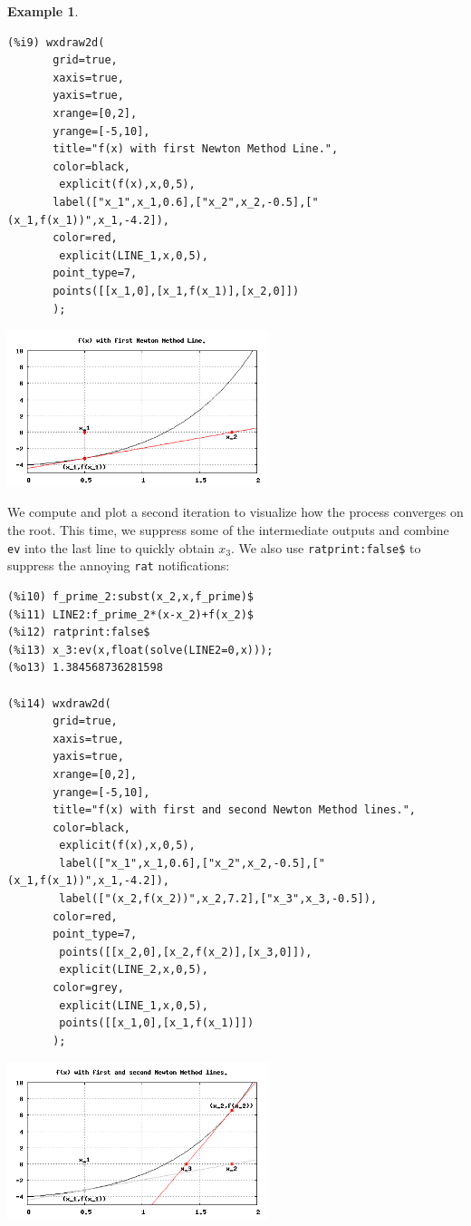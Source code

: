 \documentclass[10.5pt,twoside]{report}
\theoremstyle{definition}
\newtheorem{exmp}{Example}[section]
\begin{document}
\begin{exmp}
\begin{verbatim}
(%i9) wxdraw2d(
       grid=true,
       xaxis=true,
       yaxis=true,
       xrange=[0,2],
       yrange=[-5,10],
       title="f(x) with first Newton Method Line.",
       color=black,
        explicit(f(x),x,0,5),
       label(["x_1",x_1,0.6],["x_2",x_2,-0.5],["(x_1,f(x_1))",x_1,-4.2]),
       color=red,
        explicit(LINE_1,x,0,5),
       point_type=7,
       points([[x_1,0],[x_1,f(x_1)],[x_2,0]])
       );
\end{verbatim}


\includegraphics[width=3in]{example_5_4_1_2}


We compute and plot a second iteration to visualize how the process converges on the root. This time, we suppress some of the intermediate outputs and combine \verb|ev| into the last line to quickly obtain $x_3$.  We also use \verb|ratprint:false$| to suppress the annoying \verb|rat| notifications:

\begin{verbatim}
(%i10) f_prime_2:subst(x_2,x,f_prime)$
(%i11) LINE2:f_prime_2*(x-x_2)+f(x_2)$
(%i12) ratprint:false$
(%i13) x_3:ev(x,float(solve(LINE2=0,x)));
(%o13) 1.384568736281598

(%i14) wxdraw2d(
       grid=true,
       xaxis=true,
       yaxis=true,
       xrange=[0,2],
       yrange=[-5,10],
       title="f(x) with first and second Newton Method lines.",
       color=black,
        explicit(f(x),x,0,5),
        label(["x_1",x_1,0.6],["x_2",x_2,-0.5],["(x_1,f(x_1))",x_1,-4.2]),
        label(["(x_2,f(x_2))",x_2,7.2],["x_3",x_3,-0.5]),
       color=red,
       point_type=7,
        points([[x_2,0],[x_2,f(x_2)],[x_3,0]]),
        explicit(LINE_2,x,0,5),
       color=grey,
        explicit(LINE_1,x,0,5),
        points([[x_1,0],[x_1,f(x_1)]]) 
       );
\end{verbatim}

\includegraphics[width=3in]{example_5_4_1_3}


\end{exmp}
\end{document}
